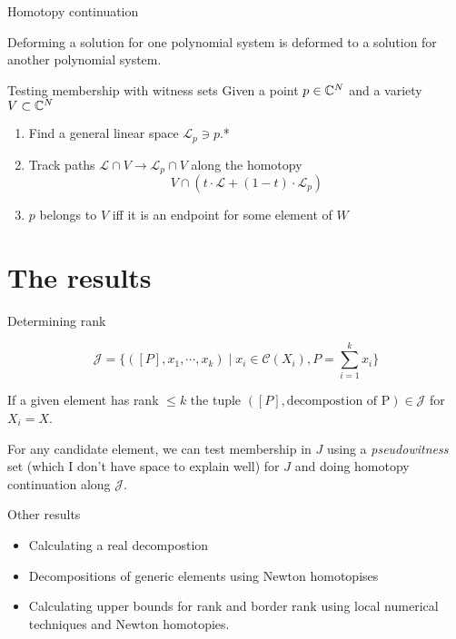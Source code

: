 \begin{frame}{Homotopy continuation}
  \begin{bee}
    Deforming a solution for one polynomial system is deformed to a solution for another polynomial system.
  \end{bee}
\end{frame}



\begin{frame}{Testing membership with witness sets}
  Given a point $p \in \mathbb{C}^{N}$ and a variety $V \subset \mathbb{C}^{N}$
  \begin{enumerate}
    \item Find a general linear space $\mathcal{L}_p \ni p$.*
    \item Track paths $\mathcal{L} \cap V \to \mathcal{L}_p \cap V$ along the homotopy
      \[V \cap (t \cdot \mathcal{L} + (1-t) \cdot \mathcal{L}_p)\]
    \item $p$ belongs to $V$ iff it is an endpoint for some element of $W$
  \end{enumerate}
\end{frame}



\section{The results}
\begin{frame}{Determining rank}
   \begin{bee}
     \[
       \mathcal{J} = \bigl\{ ([P], x_1, \cdots, x_k) \mid x_i \in \mathcal{C}(X_i), P = \sum_{i=1}^k x_i \bigr\}
     \]
   \end{bee}
   If a given element has rank $\leq k$ the tuple $([P], \text{decompostion of P}) \in \mathcal{J}$ for $X_i = X$.
   
   For any candidate element, we can test membership in $J$ using a \emph{pseudowitness} set (which I don't have space to explain well) for $J$ and doing homotopy continuation along $\mathcal{J}$.
\end{frame}

\begin{frame}{Other results}
  \begin{itemize}
    \item Calculating a real decompostion
    \item Decompositions of generic elements using Newton homotopises
    \item Calculating upper bounds for rank and border rank using local numerical techniques and Newton homotopies.
  \end{itemize}
\end{frame}



